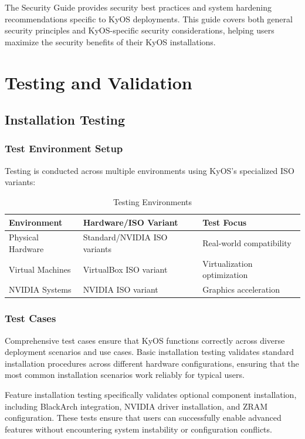 \documentclass[12pt,a4paper]{article}
\begin{document}
The Security Guide provides security best practices and system hardening recommendations specific to KyOS deployments. This guide covers both general security principles and KyOS-specific security considerations, helping users maximize the security benefits of their KyOS installations.

\section{Testing and Validation}

\subsection{Installation Testing}

\subsubsection{Test Environment Setup}
Testing is conducted across multiple environments using KyOS's specialized ISO variants:

\begin{table}[H]
\centering
\begin{tabular}{@{}lll@{}}
\toprule
\textbf{Environment} & \textbf{Hardware/ISO Variant} & \textbf{Test Focus} \\
\midrule
Physical Hardware & Standard/NVIDIA ISO variants & Real-world compatibility \\
Virtual Machines & VirtualBox ISO variant & Virtualization optimization \\
NVIDIA Systems & NVIDIA ISO variant & Graphics acceleration \\
\bottomrule
\end{tabular}
\caption{Testing Environments}
\end{table}

\subsubsection{Test Cases}
Comprehensive test cases ensure that KyOS functions correctly across diverse deployment scenarios and use cases. Basic installation testing validates standard installation procedures across different hardware configurations, ensuring that the most common installation scenarios work reliably for typical users.

Feature installation testing specifically validates optional component installation, including BlackArch integration, NVIDIA driver installation, and ZRAM configuration. These tests ensure that users can successfully enable advanced features without encountering system instability or configuration conflicts.
\end{document}
